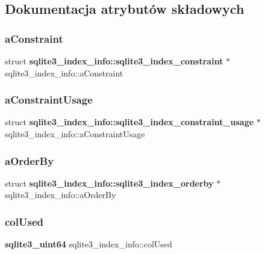 \subsection{Dokumentacja atrybutów składowych}
\mbox{\label{structsqlite3__index__info_a634aa93834e2b47acf34454746c0f248}} 
\subsubsection{aConstraint}
{\footnotesize\ttfamily struct \textbf{ sqlite3\+\_\+index\+\_\+info\+::sqlite3\+\_\+index\+\_\+constraint} $\ast$ sqlite3\+\_\+index\+\_\+info\+::a\+Constraint}

\mbox{\label{structsqlite3__index__info_a79b8a969dd7d582fc2ea3c0fbc5adb56}} 
\subsubsection{aConstraintUsage}
{\footnotesize\ttfamily struct \textbf{ sqlite3\+\_\+index\+\_\+info\+::sqlite3\+\_\+index\+\_\+constraint\+\_\+usage} $\ast$ sqlite3\+\_\+index\+\_\+info\+::a\+Constraint\+Usage}

\mbox{\label{structsqlite3__index__info_a6823a68979e19d8e332389361e920ef9}} 
\subsubsection{aOrderBy}
{\footnotesize\ttfamily struct \textbf{ sqlite3\+\_\+index\+\_\+info\+::sqlite3\+\_\+index\+\_\+orderby} $\ast$ sqlite3\+\_\+index\+\_\+info\+::a\+Order\+By}

\mbox{\label{structsqlite3__index__info_a99787169e2f78c0728bdb339c4107a2e}} 
\subsubsection{colUsed}
{\footnotesize\ttfamily \textbf{ sqlite3\+\_\+uint64} sqlite3\+\_\+index\+\_\+info\+::col\+Used}


